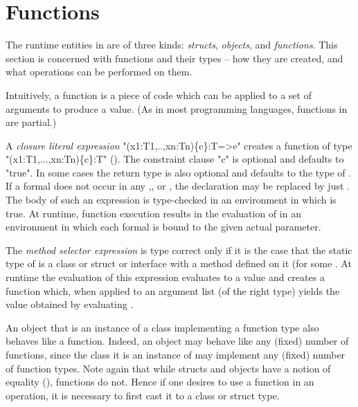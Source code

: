 \chapter{Functions}
\label{Functions}
\label{functions}

The runtime entities in \Xten{} are of three kinds: \emph{structs},
\emph{objects}, and \emph{functions}. This section is concerned with
functions and their types -- how they are created, and what operations
can be performed on them.

Intuitively, a function is a piece of code which can be applied to a
set of arguments to produce a value. (As in most programming
languages, functions in \Xten{} are partial.)

A \emph{closure literal expression} 
\xcd"(x1:T1,..,xn:Tn)\{c\}:T=>e"
creates a function of type \xcd"(x1:T1,...,xn:Tn)\{c\}:T" (). The constraint
clause \xcd"{c}" is optional and defaults to \xcd"{true}". In some cases the
return type  is also optional and defaults to the type of . If a
formal  does not occur in any ,, or , the declaration  may be
replaced by just . The body  of such an expression is type-checked
in an environment in which  is true. At runtime, function execution
results in the evaluation of  in an environment in which each formal
is bound to the given actual parameter.

The \emph{method selector expression}  is type
correct only if it is the case that the static type of  is a
class or struct or interface with a method
 defined on it (for some
. At runtime the evaluation of this expression
evaluates  to a value  and creates a function 
which, when applied to an argument list  (of the right
type) yields the value obtained by evaluating .


An object  that is an instance of a class implementing a function
type  also behaves like a function. Indeed, an
object may behave like any (fixed) number of functions, since the
class it is an instance of may implement any (fixed) number of
function types. Note again that while structs and objects have a
notion of equality (\Xcd{==}), functions do not. Hence if one desires to use
a function  in an \Xcd{==} operation, it is necessary to first cast it to a
class or struct type.


  
%


